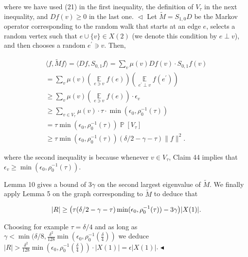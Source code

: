 \documentclass[10pt,a4paper]{article}
\begin{document}
where we have used (21) in the first inequality, the definition of $V_{\tau}$ in the next inequality, and $Df(v)\geq 0$ in the last one.
$\vartriangleleft$
Let $\tilde{M}=S_{1,0}D$  be the Markov operator corresponding to the random walk that starts at an edge $e$, selects a random vertex such that $e\cup\{v\}\in X(2)$ (we denote this condition by $e\perp v$), and then chooses a random $e^{\prime}\ni v$.
Then,\par


\[\begin{gathered}
\displaystyle\langle f,\tilde{M}f\rangle=\langle Df,S_{0,1}f\rangle \displaystyle=\sum_{v}\mu(v)Df(v)\cdot S_{0,1}f(v) \\
\displaystyle=\sum_{v}\mu(v)(\operatorname*{\mathbb{E}}_{e\ni v}f(e))(\operatorname*{\mathbb{E}}_{e^{\prime}\perp v}f(e^{\prime})) \\
\displaystyle\geq\sum_{v}\mu(v)(\operatorname*{\mathbb{E}}_{e\ni v}f(e))\cdot\epsilon_{v} \\
\displaystyle\geq\sum_{v\in V_{\tau}}\mu(v)\cdot\tau\cdot\min(\epsilon_{0},\rho_{0}^{-1}(\tau)) \\
\displaystyle=\tau\min(\epsilon_{0},\rho_{0}^{-1}(\tau))\operatorname*{\mathbb{P}}[V_{\tau}] \\
\displaystyle\geq\tau\min(\epsilon_{0},\rho_{0}^{-1}(\tau))(\delta/2-\gamma-\tau)\lVert f\rVert^{2}.
\end{gathered}\]


where the second inequality is because whenever $v\in V_{\tau}$, Claim 44 implies that $\epsilon_{v}\geq\min(\epsilon_{0},\rho_{0}^{-1}(\tau))$.\par




Lemma 10 gives a bound of $3\gamma$ on the second largest eigenvalue of $\tilde{M}$. We finally apply Lemma 5 on the graph corresponding to $\tilde{M}$ to deduce that\par


\[\begin{gathered}
|R|\geq\big{(}\tau(\delta/2-\gamma-\tau)\min(\epsilon_{0},\rho_{0}^{-1}(\tau))-3\gamma\big{)}|X(1)|.
\end{gathered}\]


Choosing for example $\tau=\delta/4$ and as long as $\gamma<\min(\delta/8,\frac{\delta^{2}}{128}\min(\epsilon_{0},\rho_{0}^{-1}(\frac{\delta}{4}))$ we deduce $|R|>\frac{\delta^{2}}{128}\min(\epsilon_{0},\rho_{0}^{-1}(\frac{\delta}{4}))\cdot|X(1)|=\epsilon|X(1)|$.
$\blacktriangleleft$\par
\end{document}
